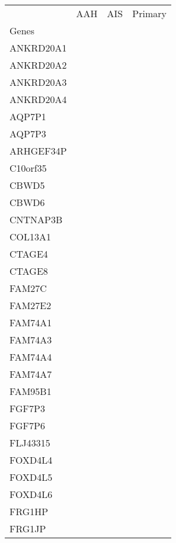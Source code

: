 \begin{tabular}{lccc}
\toprule
{} & AAH & AIS & Primary \\
Genes              &     &     &         \\
\midrule
ANKRD20A1          &     &     &         \\
ANKRD20A2          &     &     &         \\
ANKRD20A3          &     &     &         \\
ANKRD20A4          &     &     &         \\
AQP7P1             &     &     &         \\
AQP7P3             &     &     &         \\
ARHGEF34P          &     &     &         \\
C10orf35           &     &     &         \\
CBWD5              &     &     &         \\
CBWD6              &     &     &         \\
CNTNAP3B           &     &     &         \\
COL13A1            &     &     &         \\
CTAGE4             &     &     &         \\
CTAGE8             &     &     &         \\
FAM27C             &     &     &         \\
FAM27E2            &     &     &         \\
FAM74A1            &     &     &         \\
FAM74A3            &     &     &         \\
FAM74A4            &     &     &         \\
FAM74A7            &     &     &         \\
FAM95B1            &     &     &         \\
FGF7P3             &     &     &         \\
FGF7P6             &     &     &         \\
FLJ43315           &     &     &         \\
FOXD4L4            &     &     &         \\
FOXD4L5            &     &     &         \\
FOXD4L6            &     &     &         \\
FRG1HP             &     &     &         \\
FRG1JP             &     &     &         \\

\end{tabular}
